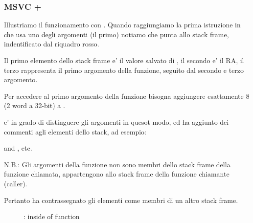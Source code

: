 \subsubsection{MSVC + \olly}
\myindex{\olly}
Illustriamo il funzionamento con \olly.
Quando raggiungiamo la prima istruzione in \ttf che usa uno degli argomenti (il primo) 
notiamo che \EBP punta allo \gls{stack frame}, indentificato dal riquadro rosso.

Il primo elemento dello \gls{stack frame} e' il valore salvato di \EBP, 
il secondo e' il \ac{RA}, il terzo rappresenta il primo argomento della funzione, seguito dal secondo e terzo argomento.

Per accedere al primo argomento della funzione bisogna aggiungere esattamente 8 (2 word a 32-bit) a \EBP.

\olly e' in grado di distinguere gli argomenti in quesot modo, ed ha aggiunto dei commenti agli elementi dello stack, ad esempio:

 and , etc.

N.B.: Gli argomenti della funzione non sono membri dello stack frame della funzione chiamata, appartengono allo stack frame della
funzione chiamante (\gls{caller}).

Pertanto \olly ha contrassegnato gli elementi  come membri di un altro stack frame.

\begin{figure}[H]
\centering
{}
\caption{\olly: inside of \ttf{} function}
\label{fig:passing_arguments_olly}
\end{figure}
